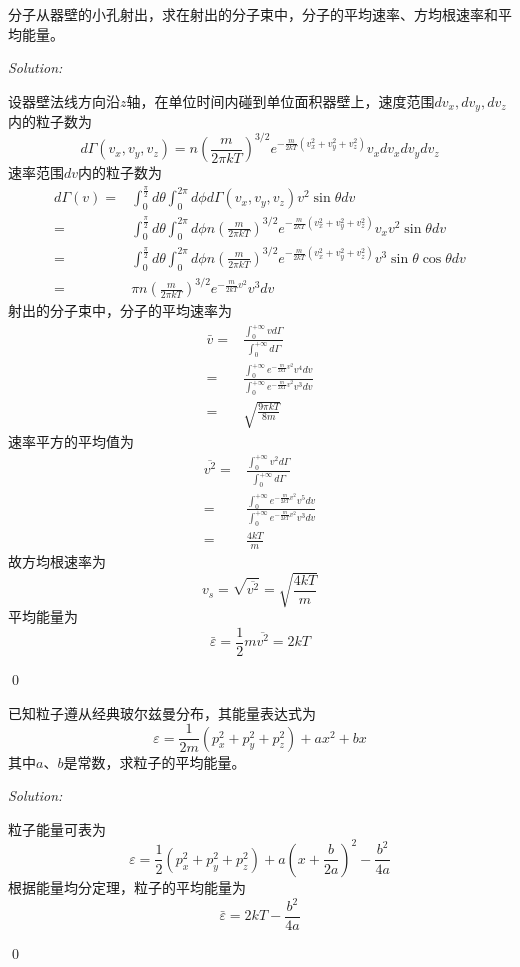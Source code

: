 \documentclass[12pt,a4paper]{article}
\newenvironment{problem}[2][Problem]{\begin{trivlist}
\item[\hskip \labelsep {\bfseries #1}\hskip \labelsep {\bfseries #2.}]}{\end{trivlist}}
\newenvironment{sol}
    {\emph{Solution:}
    }
    {
    \qed
    }
\begin{document}
\begin{problem}{7.14}
分子从器壁的小孔射出，求在射出的分子束中，分子的平均速率、方均根速率和平均能量。
\end{problem}
\begin{sol}
设器壁法线方向沿$z$轴，在单位时间内碰到单位面积器壁上，速度范围$dv_x,dv_y,dv_z$内的粒子数为
\begin{equation}
d\Gamma(v_x,v_y,v_z)=n\left(\frac{m}{2\pi kT}\right)^{3/2}e^{-\frac{m}{2kT}(v_x^2+v_y^2+v_z^2)}v_xdv_xdv_ydv_z
\end{equation}
速率范围$dv$内的粒子数为
\begin{align}
\nonumber d\Gamma(v)=&\int_0^{\frac{\pi}{2}}d\theta\int_0^{2\pi}d\phi d\Gamma(v_x,v_y,v_z)v^2\sin\theta dv\\
\nonumber=&\int_0^{\frac{\pi}{2}}d\theta\int_0^{2\pi}d\phi n\left(\frac{m}{2\pi kT}\right)^{3/2}e^{-\frac{m}{2kT}(v_x^2+v_y^2+v_z^2)}v_xv^2\sin\theta dv\\
\nonumber=&\int_0^{\frac{\pi}{2}}d\theta\int_0^{2\pi}d\phi n\left(\frac{m}{2\pi kT}\right)^{3/2}e^{-\frac{m}{2kT}(v_x^2+v_y^2+v_z^2)}v^3\sin\theta\cos\theta dv\\
=&\pi n\left(\frac{m}{2\pi kT}\right)^{3/2}e^{-\frac{m}{2kT}v^2}v^3dv
\end{align}
射出的分子束中，分子的平均速率为
\begin{align}
\nonumber\bar{v}=&\frac{\int_0^{+\infty}vd\Gamma}{\int_0^{+\infty}d\Gamma}\\
\nonumber=&\frac{\int_0^{+\infty}e^{-\frac{m}{2kT}v^2}v^4dv}{\int_0^{+\infty}e^{-\frac{m}{2kT}v^2}v^3dv}\\
=&\sqrt{\frac{9\pi kT}{8m}}
\end{align}
速率平方的平均值为
\begin{align}
\nonumber\overline{v^2}=&\frac{\int_0^{+\infty}v^2d\Gamma}{\int_0^{+\infty}d\Gamma}\\
\nonumber=&\frac{\int_0^{+\infty}e^{-\frac{m}{2kT}v^2}v^5dv}{\int_0^{+\infty}e^{-\frac{m}{2kT}v^2}v^3dv}\\
=&\frac{4kT}{m}
\end{align}
故方均根速率为
\begin{equation}
v_s=\sqrt{\overline{v^2}}=\sqrt{\frac{4kT}{m}}
\end{equation}
平均能量为
\begin{equation}
\bar{\varepsilon}=\frac{1}{2}m\overline{v^2}=2kT
\end{equation}
\end{sol}

\begin{problem}{7.16}
已知粒子遵从经典玻尔兹曼分布，其能量表达式为
\[
\varepsilon=\frac{1}{2m}(p_x^2+p_y^2+p_z^2)+ax^2+bx
\]
其中$a$、$b$是常数，求粒子的平均能量。
\end{problem}
\begin{sol}
粒子能量可表为
\begin{equation}
\varepsilon=\frac{1}{2}(p_x^2+p_y^2+p_z^2)+a(x+\frac{b}{2a})^2-\frac{b^2}{4a}
\end{equation}
根据能量均分定理，粒子的平均能量为
\begin{equation}
\bar{\varepsilon}=2kT-\frac{b^2}{4a}
\end{equation}
\end{sol}
\end{document}
